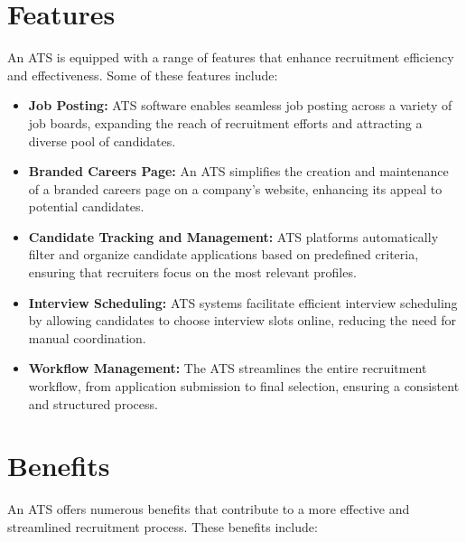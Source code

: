 \documentclass[
]{book}
\begin{document}
\hypertarget{features}{%
\section{Features}\label{features}}

An ATS is equipped with a range of features that enhance recruitment efficiency and effectiveness. Some of these features include:

\begin{itemize}
\item
  \textbf{Job Posting:} ATS software enables seamless job posting across a variety of job boards, expanding the reach of recruitment efforts and attracting a diverse pool of candidates.
\item
  \textbf{Branded Careers Page:} An ATS simplifies the creation and maintenance of a branded careers page on a company's website, enhancing its appeal to potential candidates.
\item
  \textbf{Candidate Tracking and Management:} ATS platforms automatically filter and organize candidate applications based on predefined criteria, ensuring that recruiters focus on the most relevant profiles.
\item
  \textbf{Interview Scheduling:} ATS systems facilitate efficient interview scheduling by allowing candidates to choose interview slots online, reducing the need for manual coordination.
\item
  \textbf{Workflow Management:} The ATS streamlines the entire recruitment workflow, from application submission to final selection, ensuring a consistent and structured process.
\end{itemize}

\hypertarget{benefits}{%
\section{Benefits}\label{benefits}}

An ATS offers numerous benefits that contribute to a more effective and streamlined recruitment process. These benefits include:
\end{document}

